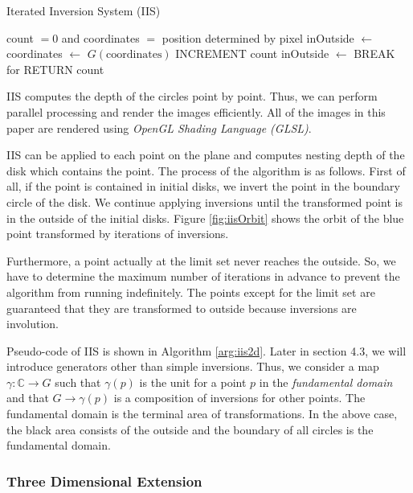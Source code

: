  \begin{algorithm}
  \caption{Iterated Inversion System (IIS)}
  \label{arg:iis2d}
  \begin{algorithmic}
   \REQUIRE count $= 0$ and coordinates $=$ position determined by
   pixel
   \STATE inOutside $\leftarrow$ \TRUE
   \STATE coordinates $\leftarrow$ $G(\text{coordinates})$
   \STATE INCREMENT count
   \STATE inOutside $\leftarrow$ \FALSE
   \ENDIF
   \ENDFOR
   \STATE BREAK for
   \ENDIF
   \ENDFOR
   \STATE RETURN count
  \end{algorithmic}
 \end{algorithm}

\noindent IIS computes the depth of the circles point by point.
Thus, we can perform parallel processing and render the images efficiently.
All of the images in this paper are rendered using
\textit{OpenGL Shading Language (GLSL)}.

IIS can be applied to each point on the plane and computes nesting depth of
the disk which contains the point.
The process of the algorithm is as follows.
First of all, if the point is contained in initial disks, we invert the
point in the boundary circle of the disk.
We continue applying inversions until the transformed point is in the
outside of the initial disks.
Figure \ref{fig:iisOrbit} shows the orbit of the blue point transformed by
iterations of inversions.

Furthermore, a point actually at the limit set never reaches the
outside. So, we have to determine the maximum number of iterations in
advance to prevent the algorithm from running indefinitely.
The points except for the limit set are guaranteed that they
are transformed to outside because inversions are involution.

Pseudo-code of IIS is shown in Algorithm \ref{arg:iis2d}.
Later in section 4.3, we will introduce generators other than simple inversions.
Thus, we consider a map $\gamma : \mathbb{C} \to G$ such that $\gamma(p)$ is the unit for a point $p$ in the
\textit{fundamental domain} and that $G \to \gamma(p)$ is a composition of inversions for other
points.
The fundamental domain is the terminal area of transformations. 
In the above case, the black area consists of the outside and the
boundary of all circles is the fundamental domain.

\subsubsection{Three Dimensional Extension}

